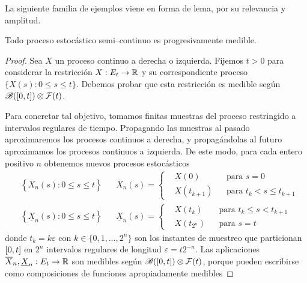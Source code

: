 La siguiente familia de ejemplos viene en forma de lema, por su relevancia y amplitud.

\begin{lemma}
  \label{lemma:semiContinuousProcessesAreProgressivelyMeasurable}
  Todo proceso estocástico semi--continuo es progresivamente medible.
\end{lemma}
\begin{proof}
  Sea \(X\) un proceso continuo a derecha o izquierda.
  Fijemos \(t > 0\) para considerar la restricción \(X : E_t \rightarrow \mathbb{R}\) y su correspondiente proceso \(\{X(s) : 0 \leq s \leq t\}\).
  Debemos probar que esta restricción es medible según \(\mathscr{B}([0, t]) \otimes \mathcal{F}(t)\).

  Para concretar tal objetivo, tomamos finitas muestras del proceso restringido a intervalos regulares de tiempo.
  Propagando las muestras al pasado aproximaremos los procesos continuos a derecha, y propagándolas al futuro aproximamos los procesos continuos a izquierda.
  De este modo, para cada entero positivo \(n\) obtenemos nuevos procesos estocásticos
  \newcommand{\backPropagation}[1]{\overline{#1}}
  \newcommand{\forwardPropagation}[1]{\underline{#1}}
  \begin{align}
    &\left\{ \backPropagation{X}_n(s) : 0 \leq s \leq t \right\}
    &&
    \backPropagation{X}_n(s)
    =
    \left\{
      \begin{aligned}
        &X(0) 
          &&\text{para } 
            s = 0
          \\
        &X(t_{k + 1})
          &&\text{para }
            t_k < s \leq t_{k + 1}
      \end{aligned}
    \right.
    \\
    &\left\{ \forwardPropagation{X}_n(s) : 0 \leq s \leq t \right\}
    &&
    \forwardPropagation{X}_n(s)
    =
    \left\{
      \begin{aligned}
        &X(t_k)
          &&\text{para }
            t_k \leq s < t_{k + 1}
        \\
        &X(t_{2^n}) 
          &&\text{para } 
            s = t
      \end{aligned}
    \right.
  \end{align}
  donde \(t_k = k \varepsilon\) con \(k \in \{0, 1, \dots, 2^n\}\) son los instantes de muestreo que particionan \(\interval{cc}{0}{t}\) en \(2^n\) intervalos regulares de longitud \(\varepsilon = t 2^{- n}\).
  Las aplicaciones \(\backPropagation{X}_n, \forwardPropagation{X}_n : E_t \rightarrow \realNumbers\) son medibles según \(\borel(\interval{cc}{0}{t}) \otimes \events(t)\), porque pueden escribirse como composiciones de funciones apropiadamente medibles

\end{proof}

